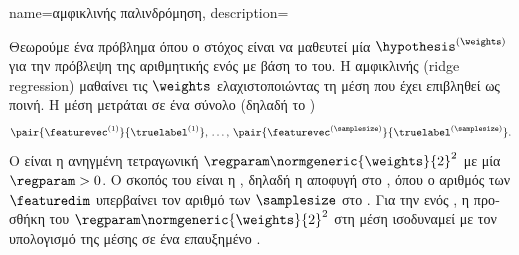{name={\foreignlanguage{greek}{αμφικλινής παλινδρόμηση}}, 
	description={\foreignlanguage{greek}{Θεωρούμε ένα πρόβλημα}  \foreignlanguage{greek}{όπου 
		ο στόχος είναι να μαθευτεί μία}  $\hypothesis^{(\weights)}$ 
		\foreignlanguage{greek}{για την πρόβλεψη της αριθμητικής}  \foreignlanguage{greek}{ενός} 
		 \foreignlanguage{greek}{με βάση το}  \foreignlanguage{greek}{του}. 
	  	\foreignlanguage{greek}{Η αμφικλινής}  
		(ridge regression) \foreignlanguage{greek}{μαθαίνει τις}  $\weights$ \foreignlanguage{greek}{ελαχιστοποιώντας 
		τη μέση}  \foreignlanguage{greek}{που έχει επιβληθεί ως ποινή. Η μέση}  
		\foreignlanguage{greek}{μετράται σε ένα σύνολο}  \foreignlanguage{greek}{(δηλαδή το} 
		) $$\pair{\featurevec^{(1)}}{\truelabel^{(1)}}, \,\ldots, \,\pair{\featurevec^{(\samplesize)}}{\truelabel^{(\samplesize)}}.$$ 
		\foreignlanguage{greek}{Ο}  \foreignlanguage{greek}{είναι η ανηγμένη τετραγωνική}  
		$\regparam \normgeneric{\weights}{2}^{2}$ \foreignlanguage{greek}{με μία}   
		$\regparam > 0$. \foreignlanguage{greek}{Ο σκοπός του}  \foreignlanguage{greek}{είναι η} 
		, \foreignlanguage{greek}{δηλαδή η αποφυγή}  \foreignlanguage{greek}{στο} 
		, \foreignlanguage{greek}{όπου ο αριθμός των}  $\featuredim$ 
		\foreignlanguage{greek}{υπερβαίνει τον αριθμό των}  $\samplesize$ \foreignlanguage{greek}{στο} 
		. \foreignlanguage{greek}{Για την}  \foreignlanguage{greek}{ενός} , 
		\foreignlanguage{greek}{η προσθήκη του $\regparam \normgeneric{\weights}{2}^{2}$ στη μέση}  
		\foreignlanguage{greek}{ισοδυναμεί με τον υπολογισμό της μέσης}  \foreignlanguage{greek}{σε ένα 
		επαυξημένο} . 
		\begin{figure}[H]
			\begin{center} 
				\begin{tikzpicture}[scale = 1]

\end{tikzpicture}
\end{center}
\end{figure}}}
